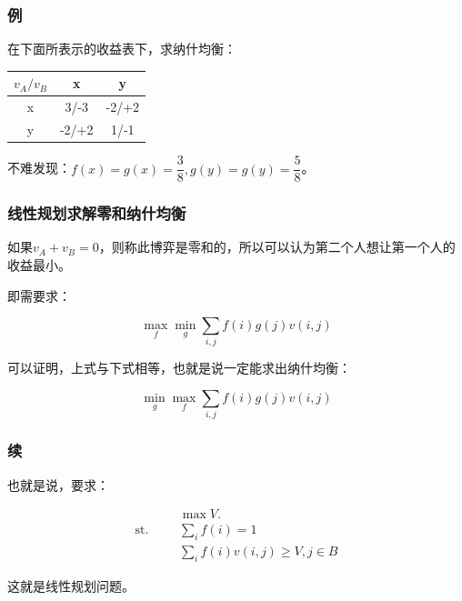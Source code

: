 \documentclass[10pt]{beamer}
\begin{document}
	\begin{frame}
		\frametitle{例}
	
		在下面所表示的收益表下，求纳什均衡：
		\begin{tabular}{|c|c|c|}   
			\hline   $v_A/v_B$ & x & y \\   
			\hline   x & 3/-3 & -2/+2  \\ 
			\hline   y & -2/+2 & 1/-1  \\  
			\hline   
		\end{tabular}

		不难发现：$f(x)=g(x)=\dfrac 38,g(y)=g(y)=\dfrac 58$。
	\end{frame}
	\begin{frame}
		\frametitle{线性规划求解零和纳什均衡}
	
		如果$v_A+v_B=0$，则称此博弈是零和的，所以可以认为第二个人想让第一个人的收益最小。

		即需要求：

		$$
		\max_f \min_g \sum_{i,j} f(i)g(j)v(i,j)
		$$

		可以证明，上式与下式相等，也就是说一定能求出纳什均衡：

		$$
		\min_g \max_f \sum_{i,j} f(i)g(j)v(i,j)
		$$
	
	\end{frame}
	\begin{frame}
		\frametitle{续}
	
		也就是说，要求：

		$$
		\begin{aligned}
			&&&\max V.\\
			\mathrm{st.}&&&\sum_{i} f(i)=1\\
			&&&\sum_{i} f(i)v(i,j)\ge V,j\in B
		\end{aligned}
		$$

		这就是线性规划问题。
	
	\end{frame}
\end{document}
